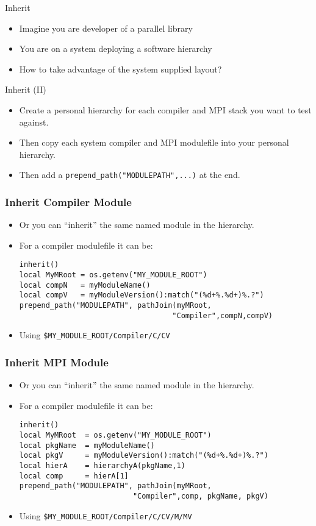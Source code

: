 \documentclass{beamer}
\begin{document}
\begin{frame}{Inherit}
  \begin{itemize}
    \item Imagine you are developer of a parallel library
    \item You are on a system deploying a software hierarchy
    \item How to take advantage of the system supplied layout?
  \end{itemize}
\end{frame}

\begin{frame}{Inherit (II)}
  \begin{itemize}
    \item Create a personal hierarchy for each compiler and MPI stack
      you want to test against.
    \item Then copy each system compiler and MPI modulefile into your
      personal hierarchy.
    \item Then add a \texttt{prepend\_path("MODULEPATH",...)} at the
      end.
  \end{itemize}
\end{frame}

\begin{frame}[fragile]
    \frametitle{Inherit Compiler Module }
  \begin{itemize}
    \item Or you can ``inherit'' the same named module in the hierarchy.
    \item For a compiler modulefile it can be:
    {\small
\begin{verbatim}
inherit()
local MyMRoot = os.getenv("MY_MODULE_ROOT")
local compN   = myModuleName()
local compV   = myModuleVersion():match("(%d+%.%d+)%.?")
prepend_path("MODULEPATH", pathJoin(myMRoot,
                                   "Compiler",compN,compV)
\end{verbatim}
}
    \item Using \texttt{\$MY\_MODULE\_ROOT/Compiler/C/CV}
  \end{itemize}
\end{frame}

\begin{frame}[fragile]
    \frametitle{Inherit MPI Module }
  \begin{itemize}
    \item Or you can ``inherit'' the same named module in the hierarchy.
    \item For a compiler modulefile it can be:
    {\small
\begin{verbatim}
inherit()
local MyMRoot  = os.getenv("MY_MODULE_ROOT")
local pkgName  = myModuleName()
local pkgV     = myModuleVersion():match("(%d+%.%d+)%.?")
local hierA    = hierarchyA(pkgName,1)
local comp     = hierA[1]
prepend_path("MODULEPATH", pathJoin(myMRoot,
                          "Compiler",comp, pkgName, pkgV)
\end{verbatim}
}
    \item Using \texttt{\$MY\_MODULE\_ROOT/Compiler/C/CV/M/MV}
  \end{itemize}
\end{frame}
\end{document}
